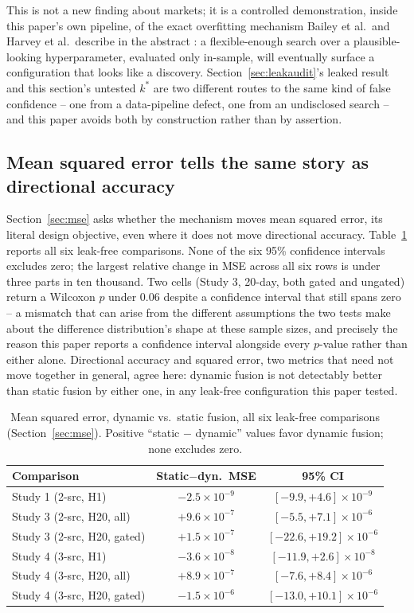 \documentclass[10pt,a4paper,twocolumn]{article}
\begin{document}
This is not a new finding about markets; it is a controlled demonstration, inside this paper's own pipeline, of the exact overfitting mechanism Bailey et al.\ and Harvey et al.\ describe in the abstract \cite{bailey2014,harvey2016}: a flexible-enough search over a plausible-looking hyperparameter, evaluated only in-sample, will eventually surface a configuration that looks like a discovery. Section~\ref{sec:leakaudit}'s leaked result and this section's untested $k^\ast$ are two different routes to the same kind of false confidence -- one from a data-pipeline defect, one from an undisclosed search -- and this paper avoids both by construction rather than by assertion.

\subsection{Mean squared error tells the same story as directional accuracy}

Section~\ref{sec:mse} asks whether the mechanism moves mean squared error, its literal design objective, even where it does not move directional accuracy. Table~\ref{tab:mse} reports all six leak-free comparisons. None of the six 95\% confidence intervals excludes zero; the largest relative change in MSE across all six rows is under three parts in ten thousand. Two cells (Study 3, 20-day, both gated and ungated) return a Wilcoxon $p$ under $0.06$ despite a confidence interval that still spans zero -- a mismatch that can arise from the different assumptions the two tests make about the difference distribution's shape at these sample sizes, and precisely the reason this paper reports a confidence interval alongside every $p$-value rather than either alone. Directional accuracy and squared error, two metrics that need not move together in general, agree here: dynamic fusion is not detectably better than static fusion by either one, in any leak-free configuration this paper tested.

\begin{table}[t]
\centering
\caption{Mean squared error, dynamic vs.\ static fusion, all six leak-free comparisons (Section~\ref{sec:mse}). Positive ``static $-$ dynamic'' values favor dynamic fusion; none excludes zero.}
\scriptsize
\begin{tabular}{@{}lcc@{}}
\toprule
Comparison & Static$-$dyn.\ MSE & 95\% CI \\
\midrule
Study 1 (2-src, H1) & $-2.5{\times}10^{-9}$ & $[-9.9,+4.6]{\times}10^{-9}$ \\
Study 3 (2-src, H20, all) & $+9.6{\times}10^{-7}$ & $[-5.5,+7.1]{\times}10^{-6}$ \\
Study 3 (2-src, H20, gated) & $+1.5{\times}10^{-7}$ & $[-22.6,+19.2]{\times}10^{-6}$ \\
Study 4 (3-src, H1) & $-3.6{\times}10^{-8}$ & $[-11.9,+2.6]{\times}10^{-8}$ \\
Study 4 (3-src, H20, all) & $+8.9{\times}10^{-7}$ & $[-7.6,+8.4]{\times}10^{-6}$ \\
Study 4 (3-src, H20, gated) & $-1.5{\times}10^{-6}$ & $[-13.0,+10.1]{\times}10^{-6}$ \\
\bottomrule
\end{tabular}
\label{tab:mse}
\end{table}
\end{document}
